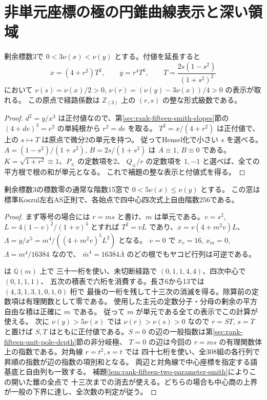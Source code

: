 \section{非単元座標の極の円錐曲線表示と深い領域}
\label{sec:rank-fifteen-nonunit-pole}
\begin{lemma}
剰余標数3で $0<3\nu(x)<\nu(y)$ とする。付値を延長すると
\[
   x=(4+r^2)T^2,\qquad y=r^4T^6,\qquad
   T=\frac{2s(1-s^2)}{(1+s^2)^2}
\]
において $\nu(s)=\nu(x)/2>0$, $\nu(r)=(\nu(y)-3\nu(x))/4>0$ の表示が取れる。
この原点で経路係数は $\mathbb Z_{(3)}$ 上の $(r,s)$ の整な形式級数である。
\end{lemma}
\begin{proof}
$d^2=y/x^3$ は正付値なので、第\ref{sec:rank-fifteen-smith-slopes}節の
$(4+de)^3=e^2$ の単純根から $r^2=de$ を取る。
$T^2=x/(4+r^2)$ は正付値で、上の $s\mapsto T$ は原点で微分2の単元を持つ。
従ってHensel化で小さい $s$ を選べる。$A=(1-s^2)/(1+s^2)$,
$B=2s/(1+s^2)$ は $A\equiv1$, $B\equiv0$ である。
$K=\sqrt{1+r^2}\equiv1$、$P_\pm$ の定数項を2、
$Q_\pm/r$ の定数項を $1,-1$ と選べば、全ての平方根で根の和が単元となる。
これで補題の整な表示と付値式を得る。
\end{proof}

\begin{theorem}\label{thm:rank-fifteen-nonunit-pole}
剰余標数3の標数零の通常な階数15窓で $0<5\nu(x)\le\nu(y)$ とする。
この窓は標準Koszul左右AS正則で、各始点で四中心四次式上自由階数256である。
\end{theorem}
\begin{proof}
まず等号の場合には $r=ms$ と書け、$m$ は単元である。$v=s^2$, $L=4(1-v)^2/(1+v)^4$ とすれば
$T^2=vL$ であり、$x=v(4+m^2v)L$、
$\Lambda=y/x^5=m^4/((4+m^2v)^5L^2)$ となる。
$v=0$ で $x_v=16$, $x_m=0$, $\Lambda=m^4/16384$ なので、
$\bar m^4=16384\bar\Lambda$ のどの根でもヤコビ行列は可逆である。

 は $\mathbb Q(m)$ 上で
三十一桁を使い、未切断経路で $(0,1,1,4,4)$、四次中心で $(0,1,1,1)$、
五次の積表で六桁を消費する。長さ6から13では $(4,3,1,3,1,0,1,0)$ 桁で
最後の一桁を残して十三次の消滅を得る。除算前の定数項は有理関数として零である。
使用した主元の定数分子・分母の剰余の平方自由な積は正確に $m$ である。
従って $m$ が単元である全ての表示でこの計算が使える。
次に $\nu(y)>5\nu(x)$ では $\nu(r)>\nu(s)>0$ なので $r=ST$, $s=T$ と置けば
$S,T$ はともに正付値である。$S=0$ の辺の一般指数は第\ref{sec:rank-fifteen-unit-pole-depth}節の非分岐極、
$T=0$ の辺は今回の $r=ms$ の有理関数体上の指数である。対角線 $r=t^2,s=t$ では
四十七桁を使い、全308組の各行列で昇順の指数が辺の指数の項別和となる。
両辺と対角線で中心座標を指定する語基底と自由列も一致する。
補題\ref{lem:rank-fifteen-two-parameter-smith}によりこの開いた錐の全点で
十三次までの消去が使える。どちらの場合も中心商の上界が一般の下界に達し、全次数の判定が従う。
\end{proof}
